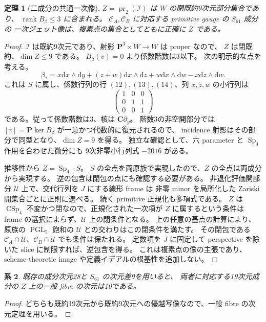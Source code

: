 \documentclass[11pt,a4paper]{ltjsarticle}
\newcommand{\CC}{\mathbf C}
\newcommand{\PP}{\mathbf P}
\newcommand{\dd}{\mathrm d}
\DeclareMathOperator{\Sp}{Sp}
\DeclareMathOperator{\CSp}{CSp}
\DeclareMathOperator{\PGL}{PGL}
\DeclareMathOperator{\rank}{rank}
\newtheorem{theorem}{定理}[section]
\newtheorem{corollary}[theorem]{系}
\theoremstyle{remark}
\begin{document}
\begin{theorem}[二成分の共通一次像]\label{thm:ambient-image}
$Z=\operatorname{pr}_2(\mathcal I)$ は $W$ の閉既約9次元部分集合であり、
$\rank B_\beta\le3$ に含まれる。
$\mathcal C_A,\mathcal C_B$ に対応する primitive gauge の $S_{61}$ 成分の
一次ジェット像は、複素点の集合としてともに正確に $Z$ である。
\end{theorem}
\begin{proof}
$\mathcal I$ は既約9次元であり、射影 $\PP^3\times W\to W$ は proper なので、
$Z$ は閉既約、$\dim Z\le9$ である。
$B_\beta(v)=0$ より係数階数は3以下。
次の明示的な点を考える。
\[
 \beta_*=x\dd x\wedge\dd y+(z+w)\dd x\wedge\dd z
            +w\dd x\wedge\dd w-x\dd z\wedge\dd w.
\]
これは $S$ に属し、係数行列の行 $(12),(13),(14)$、列 $x,z,w$ の小行列は
\[
 \begin{pmatrix}1&0&0\\0&1&1\\0&0&1\end{pmatrix}
\]
である。従って係数階数は3、核は $\CC\partial_y$。
階数3の非空開部分では $[v]=\PP\ker B_\beta$ が一意かつ代数的に復元されるので、
incidence 射影はその部分で同型となり、$\dim Z=9$ を得る。
独立な確認として、六 parameter と $\Sp_4$ 作用を合わせた微分にも
9次非零小行列式 $-2016$ がある\cite{ambient-certificate}。

推移性から $Z=\Sp_4\cdot S$。
$S$ の全点を両原族で実現したので、$Z$ の全点は両成分から実現する。
逆の包含は閉包の点にも確認する必要がある。
非退化評価開部分 $\mathcal U$ 上で、交代行列を $J$ にする線形 frame は
非零 minor を局所化した Zariski 開集合ごとに正則に選べる。
続く primitive 正規化も多項式である。
$Z$ は $\CSp_4$ 不変かつ閉なので、正規化された一次項が $Z$ に属するという条件は
frame の選択によらず、$\mathcal U$ 上の閉条件となる。
上の任意の基点の計算により、原族の $\PGL_5$ 飽和の $\mathcal U$ との交わりはこの閉条件を満たす。
その閉包である $\mathcal C_A\cap\mathcal U$、$\mathcal C_B\cap\mathcal U$ でも条件は保たれる。
定数項を $J$ に固定して perspective を除いた slice に制限すれば、逆包含を得る。
これは複素点の像の主張であり、scheme-theoretic image や定義イデアルの根基性を追加しない。
\end{proof}

\begin{corollary}
既存の成分次元28と $S_{61}$ の次元差9を用いると、
両者に対応する19次元成分の $Z$ 上の一般 fibre の次元は10である。
\end{corollary}
\begin{proof}
どちらも既約19次元から既約9次元への優越写像なので、一般 fibre の次元定理を用いる。
\end{proof}
\end{document}
